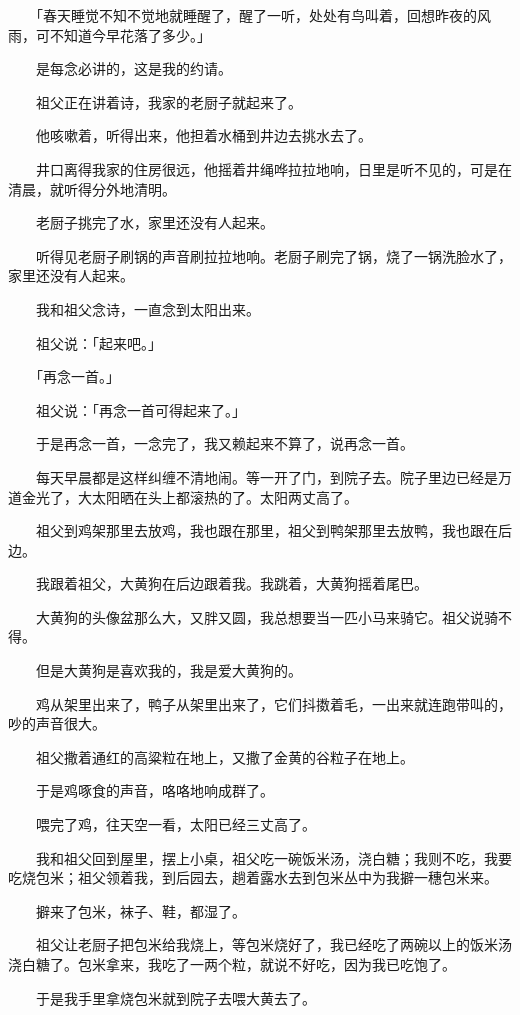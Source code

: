 \documentclass[UTF8]{ctexart}
\begin{document}
　　「春天睡觉不知不觉地就睡醒了，醒了一听，处处有鸟叫着，回想昨夜的风雨，可不知道今早花落了多少。」

　　是每念必讲的，这是我的约请。

　　祖父正在讲着诗，我家的老厨子就起来了。

　　他咳嗽着，听得出来，他担着水桶到井边去挑水去了。

　　井口离得我家的住房很远，他摇着井绳哗拉拉地响，日里是听不见的，可是在清晨，就听得分外地清明。

　　老厨子挑完了水，家里还没有人起来。

　　听得见老厨子刷锅的声音刷拉拉地响。老厨子刷完了锅，烧了一锅洗脸水了，家里还没有人起来。

　　我和祖父念诗，一直念到太阳出来。

　　祖父说：「起来吧。」

　　「再念一首。」

　　祖父说：「再念一首可得起来了。」

　　于是再念一首，一念完了，我又赖起来不算了，说再念一首。

　　每天早晨都是这样纠缠不清地闹。等一开了门，到院子去。院子里边已经是万道金光了，大太阳晒在头上都滚热的了。太阳两丈高了。

　　祖父到鸡架那里去放鸡，我也跟在那里，祖父到鸭架那里去放鸭，我也跟在后边。

　　我跟着祖父，大黄狗在后边跟着我。我跳着，大黄狗摇着尾巴。

　　大黄狗的头像盆那么大，又胖又圆，我总想要当一匹小马来骑它。祖父说骑不得。

　　但是大黄狗是喜欢我的，我是爱大黄狗的。

　　鸡从架里出来了，鸭子从架里出来了，它们抖擞着毛，一出来就连跑带叫的，吵的声音很大。

　　祖父撒着通红的高粱粒在地上，又撒了金黄的谷粒子在地上。

　　于是鸡啄食的声音，咯咯地响成群了。

　　喂完了鸡，往天空一看，太阳已经三丈高了。

　　我和祖父回到屋里，摆上小桌，祖父吃一碗饭米汤，浇白糖；我则不吃，我要吃烧包米；祖父领着我，到后园去，趟着露水去到包米丛中为我擗一穗包米来。

　　擗来了包米，袜子、鞋，都湿了。

　　祖父让老厨子把包米给我烧上，等包米烧好了，我已经吃了两碗以上的饭米汤浇白糖了。包米拿来，我吃了一两个粒，就说不好吃，因为我已吃饱了。

　　于是我手里拿烧包米就到院子去喂大黄去了。
\end{document}
